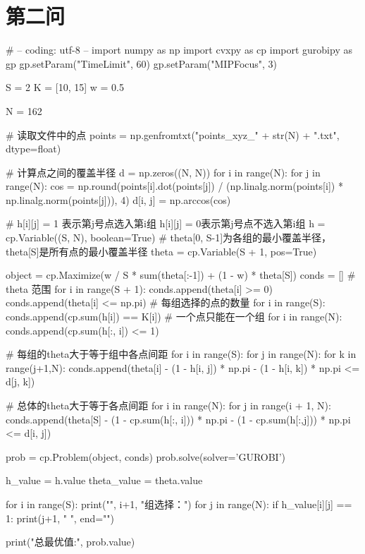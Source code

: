 \section{第二问}
\begin{python}
    # -- coding: utf-8 --
import numpy as np
import cvxpy as cp
import gurobipy as gp
gp.setParam("TimeLimit", 60)
gp.setParam("MIPFocus", 3)


S = 2
K = [10, 15]
w = 0.5

N = 162

# 读取文件中的点
points = np.genfromtxt("points_xyz_" + str(N) + ".txt", dtype=float)

# 计算点之间的覆盖半径
d = np.zeros((N, N))
for i in range(N):
    for j in range(N):
        cos = np.round(points[i].dot(points[j]) / (np.linalg.norm(points[i]) * np.linalg.norm(points[j])), 4)
        d[i, j] = np.arccos(cos)

# h[i][j] = 1 表示第j号点选入第i组   h[i][j] = 0表示第j号点不选入第i组
h = cp.Variable((S, N), boolean=True)
# theta[0, S-1]为各组的最小覆盖半径，theta[S]是所有点的最小覆盖半径
theta = cp.Variable(S + 1, pos=True)

object = cp.Maximize(w / S * sum(theta[:-1]) + (1 - w) * theta[S])
conds = []
# theta 范围
for i in range(S + 1):
    conds.append(theta[i] >= 0)
    conds.append(theta[i] <= np.pi)
# 每组选择的点的数量
for i in range(S):
    conds.append(cp.sum(h[i]) == K[i])
# 一个点只能在一个组
for i in range(N):
    conds.append(cp.sum(h[:, i]) <= 1)

# 每组的theta大于等于组中各点间距
for i in range(S):
    for j in range(N):
        for k in range(j+1,N):
            conds.append(theta[i] - (1 - h[i, j]) * np.pi - (1 - h[i, k]) * np.pi <= d[j, k])

# 总体的theta大于等于各点间距
for i in range(N):
    for j in range(i + 1, N):
        conds.append(theta[S] - (1 - cp.sum(h[:, i])) * np.pi - (1 - cp.sum(h[:,j])) * np.pi <= d[i, j])

prob = cp.Problem(object, conds)
prob.solve(solver='GUROBI')

h_value = h.value
theta_value = theta.value

for i in range(S):
    print("", i+1, "组选择：")
    for j in range(N):
        if h_value[i][j] == 1:
            print(j+1, " ", end="")

print("总最优值:", prob.value)
\end{python}